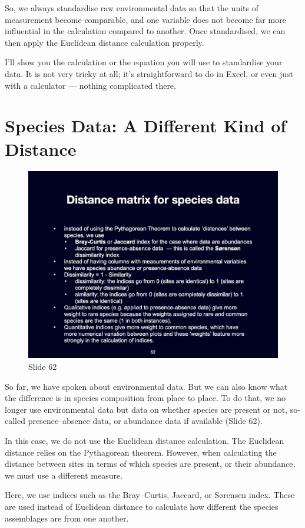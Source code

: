 \documentclass[
  11pt,
]{book}
\begin{document}
So, we always standardise raw environmental data so that the units of
measurement become comparable, and one variable does not become far more
influential in the calculation compared to another. Once standardised,
we can then apply the Euclidean distance calculation properly.

I'll show you the calculation or the equation you will use to
standardise your data. It is not very tricky at all; it's
straightforward to do in Excel, or even just with a calculator ---
nothing complicated there.

\section{Species Data: A Different Kind of
Distance}\label{species-data-a-different-kind-of-distance}

\begin{figure}[ht]
\centering
\includegraphics[width=0.8\linewidth]{../images/BDC334/BDC334-062.jpeg}
\caption*{Slide 62}
\end{figure}

So far, we have spoken about environmental data. But we can also know
what the difference is in species composition from place to place. To do
that, we no longer use environmental data but data on whether species
are present or not, so-called presence--absence data, or abundance data
if available (Slide 62).

In this case, we do not use the Euclidean distance calculation. The
Euclidean distance relies on the Pythagorean theorem. However, when
calculating the distance between sites in terms of which species are
present, or their abundance, we must use a different measure.

Here, we use indices such as the Bray--Curtis, Jaccard, or Sørensen
index. These are used instead of Euclidean distance to calculate how
different the species assemblages are from one another.
\end{document}
